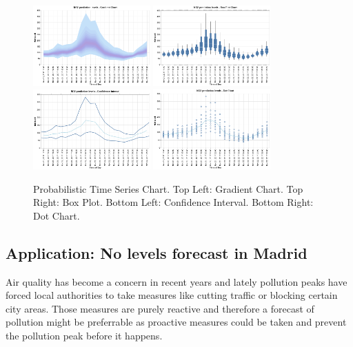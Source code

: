 \documentclass[a4paper,3p,sort&compress]{elsarticle}
\begin{document}
\begin{figure}
  \centering
  \includegraphics[width=0.4\textwidth]{gradient} 
  \includegraphics[width=0.4\textwidth]{boxplot}
  \includegraphics[width=0.4\textwidth]{ci} 
  \includegraphics[width=0.4\textwidth]{dot}
  \caption{\label{figure:charts} Probabilistic Time Series Chart. 
  Top Left: Gradient Chart. Top Right: Box Plot. 
  Bottom Left: Confidence Interval. Bottom Right: Dot Chart.  }
\end{figure}

\subsection{Application: No levels forecast in Madrid}

Air quality has become a concern in recent years and lately pollution peaks have forced local authorities to take measures like cutting traffic or blocking certain city areas. Those measures are purely reactive and therefore a forecast of pollution might be preferrable as proactive measures could be taken and prevent the pollution peak before it happens.
\end{document}

